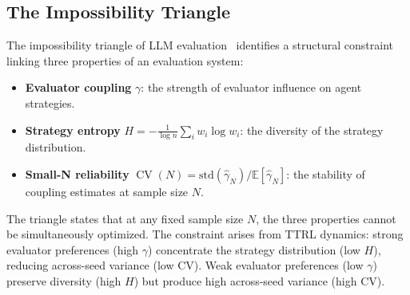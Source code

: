 \documentclass[11pt]{article}
\DeclareMathOperator{\CV}{CV}
\begin{document}
\subsection{The Impossibility Triangle}

The impossibility triangle of LLM evaluation~\cite{impossible2026} identifies a structural constraint linking three properties of an evaluation system:
\begin{itemize}[leftmargin=*,nosep]
 \item \textbf{Evaluator coupling} $\gamma$: the strength of evaluator influence on agent strategies.
 \item \textbf{Strategy entropy} $H = -\frac{1}{\log n}\sum_i w_i \log w_i$: the diversity of the strategy distribution.
 \item \textbf{Small-N reliability} $\CV(N) = \text{std}(\hat{\gamma}_N) / \mathbb{E}[\hat{\gamma}_N]$: the stability of coupling estimates at sample size $N$.
\end{itemize}

The triangle states that at any fixed sample size $N$, the three properties cannot be simultaneously optimized. The constraint arises from TTRL dynamics: strong evaluator preferences (high $\gamma$) concentrate the strategy distribution (low $H$), reducing across-seed variance (low CV). Weak evaluator preferences (low $\gamma$) preserve diversity (high $H$) but produce high across-seed variance (high CV).
\end{document}
